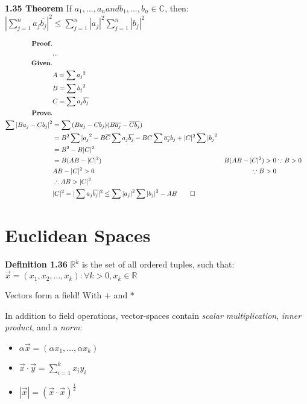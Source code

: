 \documentclass{article}
\newcommand{\DEFINITION}[1]{
  \label{def-#1}
  {\noindent \bf Definition #1}
}
\newcommand{\THEOREM}[1]{
  \label{theorem-#1}
  {\noindent \bf #1 Theorem}
}
\begin{document}
  \THEOREM{1.35} If $ a_1, ..., a_n and b_1, ..., b_n \in \mathbb{C} $, then: \\
  {\indent} $ |\sum_{j=1}^n a_j\overline{b_j}|^2 \leq \sum_{j=1}^n |a_j|^2 \sum_{j=1}^n |b_j|^2$

  \pagebreak

  \begin{align*}
    {\bf Proof.}  \\
      & ...       \\
    {\bf Given.}  \\
      & A = \sum{a_j}^2 \\
      & B = \sum{b_j}^2 \\
      & C = \sum{a_j\overline{b_j}} \\
    {\bf Prove.}  \\
      \sum{|B a_j - C b_j|}^2 & = \sum{(B a_j - C b_j)(B\overline{a_j} - \overline{C b_j})} \\
      & = B^2 \sum{|a_j}^2 - B \overline{C} \sum{a_j\overline{b_j}} - B C \sum{\overline{a_j} b_j} + |C|^2 \sum{|b_j}^2 \\
      & = B^2 - B |C|^2 \\
      & = B (AB - |C|^2)
      & B (AB - |C|^2) > 0  & \because B>0  \\
      & AB - |C|^2 > 0      & \because B>0  \\
      & \therefore AB > |C|^2               \\
      & |C|^2 = |\sum{a_j\overline{b_j}}|^2 \leq \sum{|a_j|}^2\sum{|b_j|}^2 - AB \qed \\
  \end{align*}

  \pagebreak
  \section{Euclidean Spaces}

  \DEFINITION{1.36} $\mathbb{R}^k$ is the set of all ordered tuples, such that:
  $ \vec{x} = (x_1, x_2, \dots, x_k) : \forall k > 0, x_k \in \mathbb{R} $

  Vectors form a field! With $+$ and $*$

  In addition to field operations, vector-spaces contain \emph{scalar multiplication}, \emph{inner product}, and a \emph{norm}:

  \begin{itemize}
    \item $ \alpha \vec{x} = (\alpha x_1, \dots, \alpha x_k) $
    \item $ \vec{x} \cdot \vec{y} = \sum_{i=1}^k{x_i y_i}$
    \item $ |\vec{x}| = (\vec{x} \cdot \vec{x})^\frac{1}{2} $
  \end{itemize}
\end{document}
